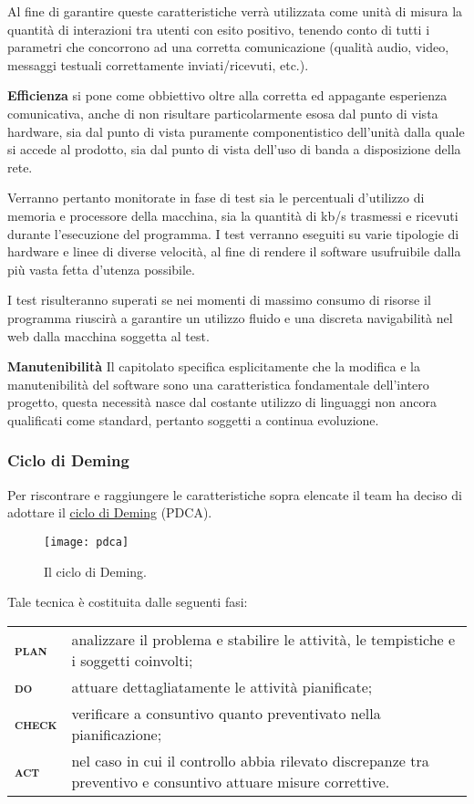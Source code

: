 \begin{description}
Al fine di garantire queste caratteristiche verrà utilizzata come unità di misura la quantità di interazioni tra utenti con esito positivo, tenendo conto di tutti i parametri che concorrono ad una corretta comunicazione (qualità audio, video, messaggi testuali correttamente inviati/ricevuti, etc.).

\item{\bfseries Efficienza}
\caName{} si pone come obbiettivo oltre alla corretta ed appagante esperienza comunicativa, anche di non risultare particolarmente esosa dal punto di vista hardware, sia dal punto di vista puramente componentistico dell'unità dalla quale si accede al prodotto, sia dal punto di vista dell'uso di banda a disposizione della rete.

Verranno pertanto monitorate in fase di test sia le percentuali d'utilizzo di memoria e processore della macchina, sia la quantità di kb/s trasmessi e ricevuti durante l'esecuzione del programma. I test verranno eseguiti su varie tipologie di hardware e linee di diverse velocità, al fine di rendere il software usufruibile dalla più vasta fetta d'utenza possibile.

I test risulteranno superati se nei momenti di massimo consumo di risorse il programma riuscirà a garantire un utilizzo fluido e una discreta navigabilità nel web dalla macchina soggetta al test. 

\item{\bfseries Manutenibilità}
Il capitolato specifica esplicitamente che la modifica e la manutenibilità del software sono una caratteristica fondamentale dell'intero progetto, questa necessità nasce dal costante utilizzo di linguaggi non ancora qualificati come standard, pertanto soggetti a continua evoluzione.
\end{description}

\subsubsection{Ciclo di Deming}
Per riscontrare e raggiungere le caratteristiche sopra elencate il team ha deciso di adottare il \underline{ciclo di Deming} (PDCA)\@.

\begin{figure}[h]
\centering
\texttt{[image: pdca]}
\caption{Il ciclo di Deming.}\label{fig:pdca}
\end{figure}

Tale tecnica è costituita dalle seguenti fasi:

\begin{tabularx}{.9\textwidth}{>{\bfseries\scshape}lX}
plan  & analizzare il problema e stabilire le attività, le tempistiche e i soggetti coinvolti;\\
do    & attuare dettagliatamente le attività pianificate;\\
check & verificare a consuntivo quanto preventivato nella pianificazione;\\
act   & nel caso in cui il controllo abbia rilevato discrepanze tra preventivo e consuntivo attuare misure correttive.\\
\end{tabularx}

